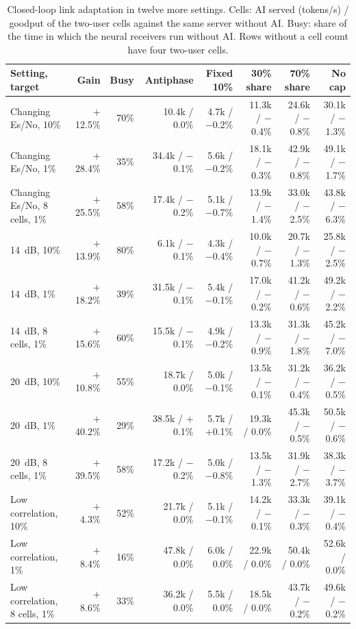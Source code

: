 \documentclass[acmsmall,screen,review,anonymous]{acmart}
\newcommand{\sys}{Antiphase\xspace}
\begin{document}
\begin{table}[t]
\caption{Closed-loop link adaptation in twelve more settings. Cells: AI served (tokens/s) / goodput of the
two-user cells against the same server without AI. Busy: share of the time in which the neural receivers run
without AI. Rows without a cell count have four two-user cells.}
\label{tab:esno}
\footnotesize
\setlength{\tabcolsep}{2.5pt}
\begin{tabular}{@{}lrrrrrrr@{}}
\toprule
Setting, target & Gain & Busy & \sys & Fixed 10\% & 30\% share & 70\% share & No cap \\
\midrule
Changing Es/No, 10\% & $+$12.5\% & 70\% & 10.4k / 0.0\% & 4.7k / $-$0.2\% & 11.3k / $-$0.4\% & 24.6k / $-$0.8\% & 30.1k / $-$1.3\% \\
Changing Es/No, 1\% & $+$28.4\% & 35\% & 34.4k / $-$0.1\% & 5.6k / $-$0.2\% & 18.1k / $-$0.3\% & 42.9k / $-$0.8\% & 49.1k / $-$1.7\% \\
Changing Es/No, 8 cells, 1\% & $+$25.5\% & 58\% & 17.4k / $-$0.2\% & 5.1k / $-$0.7\% & 13.9k / $-$1.4\% & 33.0k / $-$2.5\% & 43.8k / $-$6.3\% \\
14~dB, 10\% & $+$13.9\% & 80\% & 6.1k / $-$0.1\% & 4.3k / $-$0.4\% & 10.0k / $-$0.7\% & 20.7k / $-$1.3\% & 25.8k / $-$2.5\% \\
14~dB, 1\% & $+$18.2\% & 39\% & 31.5k / $-$0.1\% & 5.4k / $-$0.1\% & 17.0k / $-$0.2\% & 41.2k / $-$0.6\% & 49.2k / $-$2.2\% \\
14~dB, 8 cells, 1\% & $+$15.6\% & 60\% & 15.5k / $-$0.1\% & 4.9k / $-$0.2\% & 13.3k / $-$0.9\% & 31.3k / $-$1.8\% & 45.2k / $-$7.0\% \\
20~dB, 10\% & $+$10.8\% & 55\% & 18.7k / 0.0\% & 5.0k / $-$0.1\% & 13.5k / $-$0.1\% & 31.2k / $-$0.4\% & 36.2k / $-$0.5\% \\
20~dB, 1\% & $+$40.2\% & 29\% & 38.5k / $+$0.1\% & 5.7k / $+$0.1\% & 19.3k / 0.0\% & 45.3k / $-$0.5\% & 50.5k / $-$0.6\% \\
20~dB, 8 cells, 1\% & $+$39.5\% & 58\% & 17.2k / $-$0.2\% & 5.0k / $-$0.8\% & 13.5k / $-$1.3\% & 31.9k / $-$2.7\% & 38.3k / $-$3.7\% \\
Low correlation, 10\% & $+$4.3\% & 52\% & 21.7k / 0.0\% & 5.1k / $-$0.1\% & 14.2k / $-$0.1\% & 33.3k / $-$0.3\% & 39.1k / $-$0.4\% \\
Low correlation, 1\% & $+$8.4\% & 16\% & 47.8k / 0.0\% & 6.0k / 0.0\% & 22.9k / 0.0\% & 50.4k / 0.0\% & 52.6k / 0.0\% \\
Low correlation, 8 cells, 1\% & $+$8.6\% & 33\% & 36.2k / 0.0\% & 5.5k / 0.0\% & 18.5k / 0.0\% & 43.7k / $-$0.2\% & 49.6k / $-$0.2\% \\
\bottomrule
\end{tabular}
\end{table}
\end{document}

